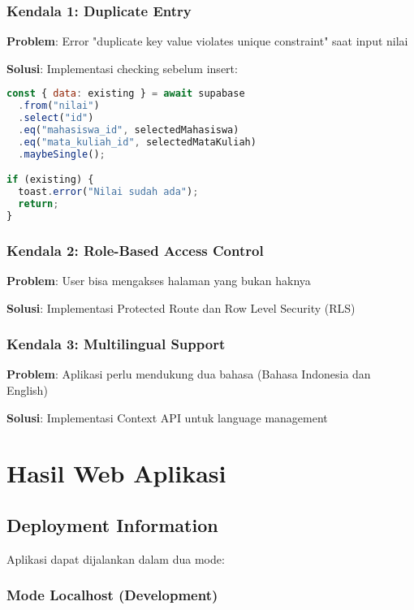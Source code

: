 \documentclass[12pt,a4paper]{article}
\begin{document}
\subsubsection{Kendala 1: Duplicate Entry}

\textbf{Problem}: Error "duplicate key value violates unique constraint" saat input nilai

\textbf{Solusi}: Implementasi checking sebelum insert:
\begin{lstlisting}[language=JavaScript]
const { data: existing } = await supabase
  .from("nilai")
  .select("id")
  .eq("mahasiswa_id", selectedMahasiswa)
  .eq("mata_kuliah_id", selectedMataKuliah)
  .maybeSingle();

if (existing) {
  toast.error("Nilai sudah ada");
  return;
}
\end{lstlisting}

\subsubsection{Kendala 2: Role-Based Access Control}

\textbf{Problem}: User bisa mengakses halaman yang bukan haknya

\textbf{Solusi}: Implementasi Protected Route dan Row Level Security (RLS)

\subsubsection{Kendala 3: Multilingual Support}

\textbf{Problem}: Aplikasi perlu mendukung dua bahasa (Bahasa Indonesia dan English)

\textbf{Solusi}: Implementasi Context API untuk language management

\newpage
\section{Hasil Web Aplikasi}

\subsection{Deployment Information}

Aplikasi dapat dijalankan dalam dua mode:

\subsubsection{Mode Localhost (Development)}
\end{document}
